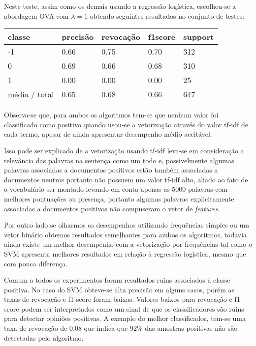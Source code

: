 Neste teste, assim como os demais usando a regressão logística, escolheu-se a abordagem OVA com
$\lambda = 1$ obtendo seguintes resultados no conjunto de testes:

\begin{table}[H]
	\centering
		\begin{tabular}{l | l | l | l | l}
		\hline
		classe  	&	precisão  &  revocação &  f1\-score &  support \\
		\hline
		 -1    &   0.66   &   0.75   &   0.70   &    312 \\
		 \hline
          0    &   0.69   &   0.66   &   0.68   &    310 \\
          \hline
          1    &   0.00   &   0.00   &   0.00    &    25 \\
		\hline
		média / total   &    0.65   &   0.68   &   0.66   &    647 \\
		\hline
	\end{tabular}
\end{table}

Observa-se que, para ambos os algoritmos tem-se que nenhum valor foi classificado como
positivo quando usou-se a vetorização através do valor tf-idf de cada termo, apesar de ainda
apresentar desempenho médio aceitável. 

Isso pode ser explicado de a vetorização usando tf-idf
leva-se em consideração a relevância das palavras na sentença como um todo e, possivelmente
algumas palavras associadas a documentos positivos estão também associadas
a documentos neutros portanto não possuem um valor tf-idf alto, aliado ao fato de o vocabulário
ser montado levando em conta apenas as 5000 palavras com melhores pontuações ou presença, portanto
algumas palavras explicitamente associadas a documentos positivos não compuseram o vetor de
\textit{features}.

Por outro lado se olharmos os desempenhos utilizando frequências simples ou um vetor binário
obtemos resultados semelhantes para ambos os algoritmos, todavia ainda existe um melhor desempenho
com a vetorização por frequências tal como o SVM apresenta melhores resultados em relação à regressão
logística, mesmo que com pouca diferença.

Comum a todos os experimentos foram resultados ruins associados à classe positiva. No caso do SVM
obteve-se alta precisão em alguns casos, porém as taxas de revocação e f1-score foram baixas. Valores
baixos para revocação e f1-score podem ser interpretados como um sinal de que os classificadores
são ruins para detectar opiniões positivas. A exemplo do melhor classificador, tem-se uma taxa
de revocação de 0,08 que indica que 92\% das amostras positivas não são detectadas pelo algoritmo.

